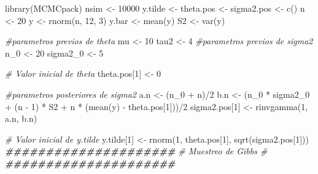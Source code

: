 \documentclass[
  10pt,
  spanish,
]{book}
\newenvironment{Shaded}{\begin{snugshade}}{\end{snugshade}}
\newcommand{\CommentTok}[1]{\textcolor[rgb]{0.56,0.35,0.01}{\textit{#1}}}
\newcommand{\DecValTok}[1]{\textcolor[rgb]{0.00,0.00,0.81}{#1}}
\newcommand{\DocumentationTok}[1]{\textcolor[rgb]{0.56,0.35,0.01}{\textbf{\textit{#1}}}}
\newcommand{\FunctionTok}[1]{\textcolor[rgb]{0.00,0.00,0.00}{#1}}
\newcommand{\NormalTok}[1]{#1}
\newcommand{\OtherTok}[1]{\textcolor[rgb]{0.56,0.35,0.01}{#1}}
\newcommand{\SpecialCharTok}[1]{\textcolor[rgb]{0.00,0.00,0.00}{#1}}
\theoremstyle{definition}
\theoremstyle{definition}
\theoremstyle{definition}
\theoremstyle{definition}
\theoremstyle{remark}
\begin{document}
\begin{Shaded}
\begin{Highlighting}[]
\FunctionTok{library}\NormalTok{(MCMCpack)}
\NormalTok{nsim }\OtherTok{\textless{}{-}} \DecValTok{10000}
\NormalTok{y.tilde }\OtherTok{\textless{}{-}}\NormalTok{ theta.pos }\OtherTok{\textless{}{-}}\NormalTok{ sigma2.pos }\OtherTok{\textless{}{-}} \FunctionTok{c}\NormalTok{()}
\NormalTok{n }\OtherTok{\textless{}{-}} \DecValTok{20}
\NormalTok{y }\OtherTok{\textless{}{-}} \FunctionTok{rnorm}\NormalTok{(n, }\DecValTok{12}\NormalTok{, }\DecValTok{3}\NormalTok{)}
\NormalTok{y.bar }\OtherTok{\textless{}{-}} \FunctionTok{mean}\NormalTok{(y)}
\NormalTok{S2 }\OtherTok{\textless{}{-}} \FunctionTok{var}\NormalTok{(y)}

\CommentTok{\#parametros previos de theta}
\NormalTok{mu }\OtherTok{\textless{}{-}} \DecValTok{10}
\NormalTok{tau2 }\OtherTok{\textless{}{-}} \DecValTok{4}
\CommentTok{\#parametros previos de sigma2}
\NormalTok{n\_0 }\OtherTok{\textless{}{-}} \DecValTok{20}
\NormalTok{sigma2\_0 }\OtherTok{\textless{}{-}} \DecValTok{5}

\CommentTok{\# Valor inicial de theta}
\NormalTok{theta.pos[}\DecValTok{1}\NormalTok{] }\OtherTok{\textless{}{-}} \DecValTok{0}

\CommentTok{\#parametros posteriores de sigma2   }
\NormalTok{a.n }\OtherTok{\textless{}{-}}\NormalTok{ (n\_0 }\SpecialCharTok{+}\NormalTok{ n)}\SpecialCharTok{/}\DecValTok{2}
\NormalTok{b.n }\OtherTok{\textless{}{-}}\NormalTok{ (n\_0 }\SpecialCharTok{*}\NormalTok{ sigma2\_0 }\SpecialCharTok{+}\NormalTok{ (n }\SpecialCharTok{{-}} \DecValTok{1}\NormalTok{) }\SpecialCharTok{*}\NormalTok{ S2 }\SpecialCharTok{+} 
\NormalTok{          n }\SpecialCharTok{*}\NormalTok{ (}\FunctionTok{mean}\NormalTok{(y) }\SpecialCharTok{{-}}\NormalTok{ theta.pos[}\DecValTok{1}\NormalTok{]))}\SpecialCharTok{/}\DecValTok{2}
\NormalTok{sigma2.pos[}\DecValTok{1}\NormalTok{] }\OtherTok{\textless{}{-}} \FunctionTok{rinvgamma}\NormalTok{(}\DecValTok{1}\NormalTok{, a.n, b.n)}

\CommentTok{\# Valor inicial de y.tilde}
\NormalTok{y.tilde[}\DecValTok{1}\NormalTok{] }\OtherTok{\textless{}{-}} \FunctionTok{rnorm}\NormalTok{(}\DecValTok{1}\NormalTok{, theta.pos[}\DecValTok{1}\NormalTok{], }\FunctionTok{sqrt}\NormalTok{(sigma2.pos[}\DecValTok{1}\NormalTok{]))}
\DocumentationTok{\#\#\#\#\#\#\#\#\#\#\#\#\#\#\#\#\#\#\#\#\#}
\CommentTok{\# Muestreo de Gibbs \#}
\DocumentationTok{\#\#\#\#\#\#\#\#\#\#\#\#\#\#\#\#\#\#\#\#\#}


\end{Highlighting}
\end{Shaded}
\end{document}
